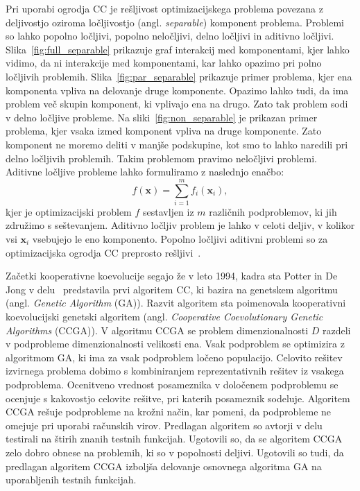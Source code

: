 Pri uporabi ogrodja CC je rešljivost optimizacijskega problema povezana z deljivostjo oziroma ločljivostjo (angl. \textit{separable}) komponent problema.
Problemi so lahko popolno ločljivi, popolno neločljivi, delno ločljivi in aditivno ločljivi.
Slika~\ref{fig:full_separable} prikazuje graf interakcij med komponentami, kjer lahko vidimo, da ni interakcije med komponentami, kar lahko opazimo pri polno ločljivih problemih.
Slika~\ref{fig:par_separable} prikazuje primer problema, kjer ena komponenta vpliva na delovanje druge komponente.
Opazimo lahko tudi, da ima problem več skupin komponent, ki vplivajo ena na drugo.
Zato tak problem sodi v delno ločljive probleme.
Na sliki~\ref{fig:non_separable} je prikazan primer problema, kjer vsaka izmed komponent vpliva na druge komponente.
Zato komponent ne moremo deliti v manjše podskupine, kot smo to lahko naredili pri delno ločljivih problemih.
Takim problemom pravimo neločljivi problemi.
Aditivne ločljive probleme lahko formuliramo z naslednjo enačbo:
\begin{equation}
    f (\mathbf{x}) = \sum_{i=1}^{\mathit{m}} f_i(\mathbf{x}_i) \label{eq:additivly_separable},
\end{equation}
kjer je optimizacijski problem $f$ sestavljen iz $m$ različnih podproblemov, ki jih združimo s seštevanjem.
Aditivno ločljiv problem je lahko v celoti deljiv, v kolikor vsi $\mathbf{x}_i$ vsebujejo le eno komponento.
Popolno ločljivi aditivni problemi so za optimizacijska ogrodja CC preprosto rešljivi~\cite{alg:dg}.

Začetki kooperativne koevolucije segajo že v leto 1994, kadra sta Potter in De Jong v delu~\cite{alg:ccga} predstavila prvi algoritem CC, ki bazira na genetskem algoritmu (angl. \textit{Genetic Algorithm} (GA)).
Razvit algoritem sta poimenovala kooperativni koevolucijski genetski algoritem (angl. \textit{Cooperative Coevolutionary Genetic Algorithms} (CCGA)).
V algoritmu CCGA se problem dimenzionalnosti $\mathit{D}$ razdeli v podprobleme dimenzionalnosti velikosti ena.
Vsak podproblem se optimizira z algoritmom GA, ki ima za vsak podproblem ločeno populacijo.
Celovito rešitev izvirnega problema dobimo s kombiniranjem reprezentativnih rešitev iz vsakega podproblema.
Ocenitveno vrednost posameznika v določenem podproblemu se ocenjuje s kakovostjo celovite rešitve, pri katerih posameznik sodeluje.
Algoritem CCGA rešuje podprobleme na krožni način, kar pomeni, da podprobleme ne omejuje pri uporabi računskih virov.
Predlagan algoritem so avtorji v delu testirali na štirih znanih testnih funkcijah.
Ugotovili so, da se algoritem CCGA zelo dobro obnese na problemih, ki so v popolnosti deljivi.
Ugotovili so tudi, da predlagan algoritem CCGA izboljša delovanje osnovnega algoritma GA na uporabljenih testnih funkcijah.

